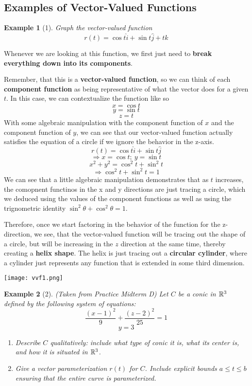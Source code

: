 \documentclass{report}
\newtheorem*{remark*}{Example}
\begin{document}
\begin{sloppypar}
\subsection{Examples of Vector-Valued Functions}
\begin{remark*}[1]
  Graph the vector-valued function
  \[ r(t) = \cos{t}\hat{i} + \sin{t}\hat{j} + t\hat{k}\]
\end{remark*}
Whenever we are looking at this function,
we first just need to \textbf{break everything down
  into its components}.
\par Remember, that this is a \textbf{vector-valued
  function}, so we can think of each
\textbf{component function} as being
representative of what the vector does
for a given $ t $. In this case,
we can contextualize the function like
so
\[ x = \cos{t}\]
\[ y = \sin{t}\]
\[ z = t \]
With some algebraic manipulation with the
component function of $ x $ and the
component function of $ y $, we can see that
our vector-valued function actually
satisfies the equation of a circle
if we ignore the behavior in the
z-axis.
\[ r(t) = \cos{t}\hat{i} + \sin{t}\hat{j} \]
\[ \Rightarrow x = \cos{t}; ~ y = \sin{t}\]
\[ x^{2} + y^{2} = \cos^{2}{t} + \sin^{2}{t} \]
\[ \Rightarrow \cos^{2}{t} + \sin^{2}{t} = 1 \]
We can see that a little algebraic manipulation
demonstrates that as $ t $ increases,
the comopnent functinos in the x and y directions
are just tracing a circle, which we deduced
using the values of the component functions
as well as using the trignometric identity
$ \sin^{2}{\theta} + \cos^{2}{\theta} = 1 $.

\par Therefore, once we start factoring in the
behavior of the function for the
z-direction, we see, that the vector-valued
function will be tracing out the shape of a circle,
but will be increasing in the $ z $ direction
at the same time, thereby creating a
\textbf{helix shape}. The helix is just tracing
out a \textbf{circular cylinder}, where a
cylinder just represents any function that
is extended in some third dimension.

\begin{center}
  \texttt{[image: vvf1.png]}
\end{center}

\begin{remark*}[2]
  (Taken from Practice Midterm D) Let $ C $ be
  a conic in $ \mathbb{R}^{3}$ defined by the following
  system of equations:
  \[ \frac{(x-1)^{2}}{9} + \frac{(z-2)^{2}}{25} = 1\]
  \[ y = 3 \]
  \begin{enumerate}
    \item Describe $ C $ qualitatively: include
          what type of conic it is, what its center
          is, and how it is situated in $ \mathbb{R}^{3} $.
    \item Give a vector parameterization $ r(t)$
          for $ C$. Include explicit bounds
          $ a \leq t \leq b $ ensuring that
          the entire curve is parameterized.
  \end{enumerate}


\end{remark*}
\end{sloppypar}
\end{document}
